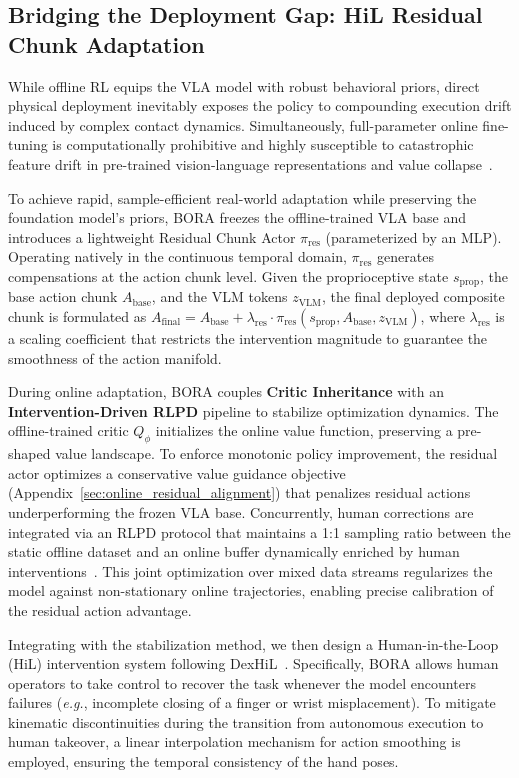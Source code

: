 \documentclass{article}
\begin{document}
\subsection{Bridging the Deployment Gap: HiL Residual Chunk Adaptation}
\label{subsec:online_adaptation}
While offline RL equips the VLA model with robust behavioral priors, direct physical deployment inevitably exposes the policy to compounding execution drift induced by complex contact dynamics. Simultaneously, full-parameter online fine-tuning is computationally prohibitive and highly susceptible to catastrophic feature drift in pre-trained vision-language representations and value collapse~\cite{zhou2025efficient}.



To achieve rapid, sample-efficient real-world adaptation while preserving the foundation model's priors, BORA freezes the offline-trained VLA base and introduces a lightweight Residual Chunk Actor $\pi_{\text{res}}$ (parameterized by an MLP). Operating natively in the continuous temporal domain, $\pi_{\text{res}}$ generates compensations at the action chunk level. Given the proprioceptive state $s_{\text{prop}}$, the base action chunk $A_{\text{base}}$, and the VLM tokens $z_{\text{VLM}}$, the final deployed composite chunk is formulated as $A_{\text{final}} = A_{\text{base}} + \lambda_{\text{res}} \cdot \pi_{\text{res}}(s_{\text{prop}}, A_{\text{base}}, z_{\text{VLM}})$, where $\lambda_{\text{res}}$ is a scaling coefficient that restricts the intervention magnitude to guarantee the smoothness of the action manifold.

During online adaptation, BORA couples \textbf{Critic Inheritance} with an \textbf{Intervention-Driven RLPD} pipeline to stabilize optimization dynamics. The offline-trained critic $Q_\phi$ initializes the online value function, preserving a pre-shaped value landscape. To enforce monotonic policy improvement, the residual actor optimizes a conservative value guidance objective (Appendix~\ref{sec:online_residual_alignment}) that penalizes residual actions underperforming the frozen VLA base. Concurrently, human corrections are integrated via an RLPD protocol that maintains a 1:1 sampling ratio between the static offline dataset and an online buffer dynamically enriched by human interventions~\cite{ball2023efficient}. This joint optimization over mixed data streams regularizes the model against non-stationary online trajectories, enabling precise calibration of the residual action advantage.

Integrating with the stabilization method, we then design a Human-in-the-Loop (HiL) intervention system following DexHiL~\cite{han2026dexhil}. Specifically, BORA allows human operators to take control to recover the task whenever the model encounters failures (\emph{e.g.}, incomplete closing of a finger or wrist misplacement). To mitigate kinematic discontinuities during the transition from autonomous execution to human takeover, a linear interpolation mechanism for action smoothing is employed, ensuring the temporal consistency of the hand poses.
\end{document}
